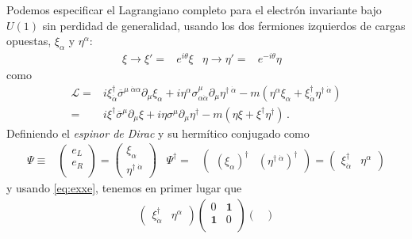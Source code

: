 \begin{frame}
Podemos especificar el Lagrangiano completo para el electrón invariante bajo $U(1)$ sin perdidad de generalidad, usando los dos fermiones izquierdos de cargas opuestas, $\xi_{\alpha}$ y $\eta^{\alpha}$:
\begin{align}
  \xi\to\xi'=&e^{i\theta}\xi &   \eta\to\eta'=&e^{-i\theta}\eta &
\end{align}
como
\begin{align}
\label{eq:dwlag}
  \mathcal{L}=&i\xi^{\dagger}_{\dot{\alpha}}\overline{\sigma}^{\mu\;\dot{\alpha}\alpha}\partial_{\mu}\xi_{\alpha}+i\eta^{\alpha}\sigma^{\mu}_{\alpha\dot{\alpha}}\partial_{\mu}\eta^{\dagger\;\dot{\alpha}}
-m \left(\eta^{\alpha} \xi_{\alpha}+\xi^{\dagger}_{\dot{\alpha}} \eta^{\dagger\;\dot{\alpha}}\right)\nonumber\\
=&i\xi^{\dagger}\overline{\sigma}^{\mu}\partial_{\mu}\xi+i\eta\sigma^{\mu}\partial_{\mu}\eta^{\dagger}
-m \left(\eta\xi+\xi^{\dagger}\eta^{\dagger} \right)\,.
\end{align}
Definiendo el \emph{espinor de Dirac}  y su hermítico conjugado como
\begin{align}
\label{eq:psid}
  \Psi\equiv&  \begin{pmatrix}
   e_L\\
   e_R\\    
  \end{pmatrix}=
  \begin{pmatrix}
   \xi_{\alpha}\\
   \eta^{\dagger\;\dot{\alpha}}    
  \end{pmatrix}&  \Psi^{\dagger}=&
  \begin{pmatrix}
   \left( \xi_{\alpha} \right)^{\dagger} & \left( \eta^{\dagger\;\dot{\alpha}} \right)^{\dagger}    
  \end{pmatrix}=  \begin{pmatrix}
  \xi^{\dagger}_{\dot{\alpha}}& \eta^{\alpha}
  \end{pmatrix}
\end{align}
y usando \eqref{eq:exxe}, tenemos en primer lugar que
\begin{align}
\label{eq:psidm}
  \begin{pmatrix}
  \xi^{\dagger}_{\dot{\alpha}}& \eta^{\alpha}
  \end{pmatrix}
  \begin{pmatrix}
    0           &\mathbf{1}\\
    \mathbf{1} &0\\
  \end{pmatrix} \begin{pmatrix}

\end{pmatrix}
\end{align}
\end{frame}
